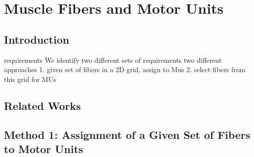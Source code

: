 %  

\chapter{Muscle Fibers and Motor Units}
\section{Introduction}
requirements
We identify two different sets of requirements 
two different approaches
1. given set of fibers in a 2D grid, assign to Mus
2. select fibers from this grid for MUs
\section{Related Works}

\section{Method 1: Assignment of a Given Set of Fibers to Motor Units}

